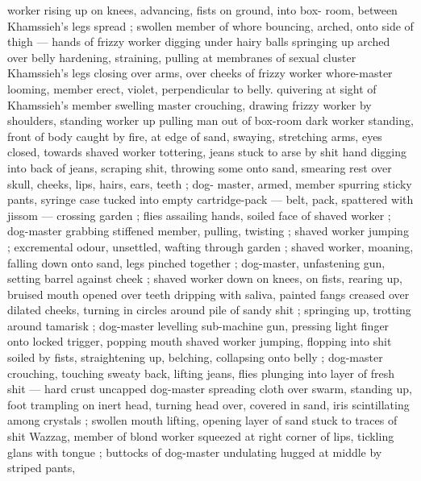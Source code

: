 worker rising up on knees, advancing, fists on ground, into box- 
room, between Khamssieh's legs spread ; swollen member of whore 
bouncing, arched, onto side of thigh --- hands of frizzy worker 
digging under hairy balls {\dashcom} springing up arched over belly 
hardening, straining, pulling at membranes of sexual cluster 
Khamssieh's legs closing over arms, over cheeks of frizzy worker 
whore-master looming, member erect, violet, perpendicular to belly. 
quivering at sight of Khamssieh's member swelling {\col} master 
crouching, drawing frizzy worker by shoulders, standing worker up 
pulling man out of box-room {\slashsemi} dark worker standing, front of body 
caught by fire, at edge of sand, swaying, stretching arms, eyes 
closed, towards shaved worker tottering, jeans stuck to arse by shit 
hand digging into back of jeans, scraping shit, throwing some onto 
sand, smearing rest over skull, cheeks, lips, hairs, ears, teeth ; dog- 
master, armed, member spurring sticky pants, syringe case tucked 
into empty cartridge-pack --- belt, pack, spattered with jissom --- 
crossing garden ; flies assailing hands, soiled face of shaved worker 
; dog-master grabbing stiffened member, pulling, twisting ; shaved 
worker jumping ; excremental odour, unsettled, wafting through 
garden ; shaved worker, moaning, falling down onto sand, legs 
pinched together ; dog-master, unfastening gun, setting barrel 
against cheek ; shaved worker down on knees, on fists, rearing up, 
bruised mouth opened over teeth dripping with saliva, painted fangs 
creased over dilated cheeks, turning in circles around pile of sandy 
shit ; springing up, trotting around tamarisk ; dog-master levelling 
sub-machine gun, pressing light finger onto locked trigger, popping 
mouth {\col} shaved worker jumping, flopping into shit soiled by fists, 
straightening up, belching, collapsing onto belly ; dog-master 
crouching, touching sweaty back, lifting jeans, flies plunging into 
layer of fresh shit --- hard crust uncapped {\coldash} dog-master spreading 
cloth over swarm, standing up, foot trampling on inert head, turning 
head over, covered in sand, iris scintillating among crystals ; swollen 
mouth lifting, opening layer of sand stuck to traces of shit 
 {\semislash} Wazzag, member of blond worker 
squeezed at right corner of lips, tickling glans with tongue ; buttocks 
of dog-master undulating hugged at middle by striped pants, 
